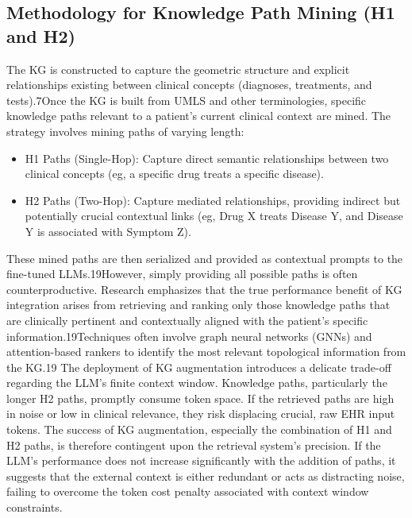 \subsection{Methodology for Knowledge Path Mining (H1 and H2)}
The KG is constructed to capture the geometric structure and explicit relationships existing between clinical concepts (diagnoses, treatments, and tests).7Once the KG is built from UMLS and other terminologies, specific knowledge paths relevant to a patient's current clinical context are mined.
The strategy involves mining paths of varying length:
\begin{itemize}
    \item H1 Paths (Single-Hop): Capture direct semantic relationships between two clinical concepts (eg, a specific drug treats a specific disease).
    \item H2 Paths (Two-Hop): Capture mediated relationships, providing indirect but potentially crucial contextual links (eg, Drug X treats Disease Y, and Disease Y is associated with Symptom Z).
\end{itemize}

These mined paths are then serialized and provided as contextual prompts to the fine-tuned LLMs.19However, simply providing all possible paths is often counterproductive. Research emphasizes that the true performance benefit of KG integration arises from retrieving and ranking only those knowledge paths that are clinically pertinent and contextually aligned with the patient's specific information.19Techniques often involve graph neural networks (GNNs) and attention-based rankers to identify the most relevant topological information from the KG.19
The deployment of KG augmentation introduces a delicate trade-off regarding the LLM's finite context window. Knowledge paths, particularly the longer H2 paths, promptly consume token space. If the retrieved paths are high in noise or low in clinical relevance, they risk displacing crucial, raw EHR input tokens. The success of KG augmentation, especially the combination of H1 and H2 paths, is therefore contingent upon the retrieval system's precision. If the LLM's performance does not increase significantly with the addition of paths, it suggests that the external context is either redundant or acts as distracting noise, failing to overcome the token cost penalty associated with context window constraints.


